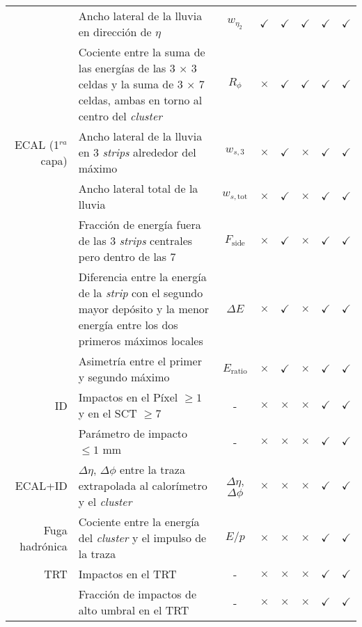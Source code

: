 \begin{table}
\begin{tabular}{ r p{8cm} c | c c | c c c }
		& Ancho lateral de la lluvia en dirección de $\eta$ & $w_{\eta_{2}}$ & $\checkmark$ & $\checkmark$ & $\checkmark$ & $\checkmark$ & $\checkmark$ \\

		& Cociente entre la suma de las energías de las 3 $\times$ 3 celdas y la suma de 3 $\times$ 7 celdas, ambas en torno al centro del \textit{cluster} & $R_{\phi}$ & $\times$ & $\checkmark$ & $\checkmark$ & $\checkmark$ & $\checkmark$ \\

	ECAL (1$^{ra}$ capa) & Ancho lateral de la lluvia en 3 \textit{strips} alrededor del máximo & $w_{s,3}$ & $\times$ & $\checkmark$ & $\times$ & $\checkmark$ & $\checkmark$ \\

		& Ancho lateral total de la lluvia & $w_{s,\text{tot}}$ & $\times$ & $\checkmark$ & $\times$ & $\checkmark$ & $\checkmark$ \\

		& Fracción de energía fuera de las 3 \textit{strips} centrales pero dentro de las 7 & $F_{\text{side}}$ & $\times$ & $\checkmark$ & $\times$ & $\checkmark$ & $\checkmark$ \\

		& Diferencia entre la energía de la \textit{strip} con el segundo mayor depósito y la menor energía entre los dos primeros máximos locales & $\Delta E$ & $\times$ & $\checkmark$ & $\times$ & $\checkmark$ & $\checkmark$ \\

		& Asimetría entre el primer y segundo máximo & $E_{\text{ratio}}$ & $\times$ & $\checkmark$ & $\times$ & $\checkmark$ & $\checkmark$ \\

	ID & Impactos en el Píxel $\ge 1$ y en el SCT $\ge 7$ & - & $\times$ & $\times$ & $\times$ & $\checkmark$ & $\checkmark$ \\

		& Parámetro de impacto $\le 1$ mm & - & $\times$ & $\times$ & $\times$ & $\checkmark$ & $\checkmark$ \\

	ECAL+ID & $\Delta\eta$, $\Delta\phi$ entre la traza extrapolada al calorímetro y el \textit{cluster} & $\Delta\eta$, $\Delta\phi$ & $\times$ & $\times$ & $\times$ & $\checkmark$ & $\checkmark$ \\

	Fuga hadrónica & Cociente entre la energía del \textit{cluster} y el impulso de la traza & $E/p$ & $\times$ & $\times$ & $\times$ & $\checkmark$ & $\checkmark$ \\

	TRT & Impactos en el TRT & - & $\times$ & $\times$ & $\times$ & $\checkmark$ & $\checkmark$ \\

		& Fracción de impactos de alto umbral en el TRT & - & $\times$ & $\times$ & $\times$ & $\checkmark$ & $\checkmark$ \\

	\hline

\end{tabular}
\label{lmttable}
\end{table}
\renewcommand{\arraystretch}{1}

